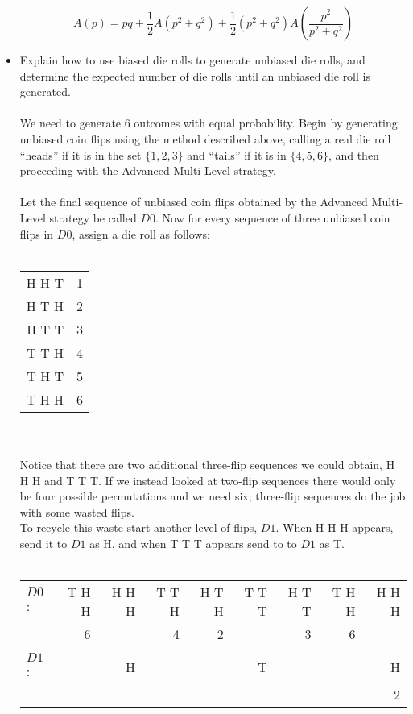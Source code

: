 \documentclass[11pt]{article}
\begin{document}
\begin{itemize}
{\begin{equation*}
A(p) = pq + \frac{1}{2}A(p^{2} + q^{2}) + \frac{1}{2}(p^{2} + q^{2})A\left( \frac{p^{2}}{p^{2} + q^{2}} \right)
\end{equation*}
}
\newpage
\item{Explain how to use biased die rolls to generate unbiased die rolls, and determine the expected number of die rolls until an unbiased die roll is generated.
\\
\\
We need to generate 6 outcomes with equal probability. Begin by generating unbiased coin flips using the method described above, calling a real die roll ``heads'' if it is in the set $\{1,2,3\}$ and ``tails'' if it is in $\{4,5,6\}$, and then proceeding with the Advanced Multi-Level strategy.
\\
\\
Let the final sequence of unbiased coin flips obtained by the Advanced Multi-Level strategy be called $D0$. Now for every sequence of three unbiased coin flips in $D0$, assign a die roll as follows:
\\
\\
\begin{tabular}{r @{ = } l}
{H H T} & 1 \\
{H T H} & 2 \\
{H T T} & 3 \\
{T T H} & 4 \\
{T H T} & 5 \\
{T H H} & 6 \\
\end{tabular}
\\
\\
Notice that there are two additional three-flip sequences we could obtain, H H H and T T T. If we instead looked at two-flip sequences there would only be four possible permutations and we need six; three-flip sequences do the job with some wasted flips.
\\
To recycle this waste start another level of flips, $D1$. When H H H appears, send it to $D1$ as H, and when T T T appears send to to $D1$ as T. 
\\
\\
\begin{tabular}{l r r r r r r r r}
{$D0$: } & {T H H} & {H H H} & {T T H} & {H T H} & {T T T} & {H T T} & {T H H} & {H H H} \\
 & 6 &  & 4 & 2 & & 3 & 6 & \\
 \\
 {$D1$: } & & H & & & T& & & H \\
 & & & & & & & & 2

\end{tabular}}
\end{itemize}
\end{document}
